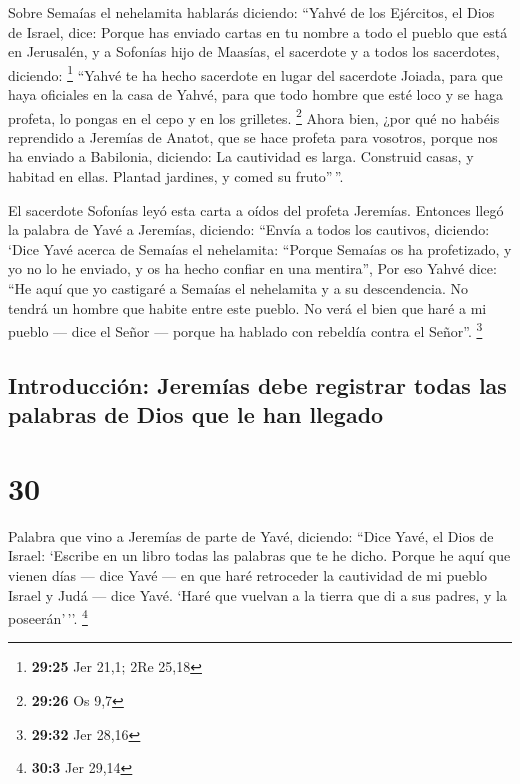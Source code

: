  Sobre Semaías el nehelamita hablarás diciendo:
 ``Yahvé de los Ejércitos, el Dios de Israel, dice:
Porque has enviado cartas en tu nombre a todo el pueblo que está en
Jerusalén, y a Sofonías hijo de Maasías, el sacerdote y a todos los
sacerdotes, diciendo: \footnote{\textbf{29:25} Jer 21,1; 2Re 25,18}
 ``Yahvé te ha hecho sacerdote en lugar del sacerdote
Joiada, para que haya oficiales en la casa de Yahvé, para que todo
hombre que esté loco y se haga profeta, lo pongas en el cepo y en los
grilletes. \footnote{\textbf{29:26} Os 9,7}  Ahora bien,
¿por qué no habéis reprendido a Jeremías de Anatot, que se hace profeta
para vosotros,  porque nos ha enviado a Babilonia,
diciendo: La cautividad es larga. Construid casas, y habitad en ellas.
Plantad jardines, y comed su fruto''\,''.

 El sacerdote Sofonías leyó esta carta a oídos del
profeta Jeremías.  Entonces llegó la palabra de Yavé a
Jeremías, diciendo:  ``Envía a todos los cautivos,
diciendo: `Dice Yavé acerca de Semaías el nehelamita: ``Porque Semaías
os ha profetizado, y yo no lo he enviado, y os ha hecho confiar en una
mentira'',  Por eso Yahvé dice: ``He aquí que yo
castigaré a Semaías el nehelamita y a su descendencia. No tendrá un
hombre que habite entre este pueblo. No verá el bien que haré a mi
pueblo --- dice el Señor --- porque ha hablado con rebeldía contra el
Señor''. \footnote{\textbf{29:32} Jer 28,16}

\hypertarget{introducciuxf3n-jeremuxedas-debe-registrar-todas-las-palabras-de-dios-que-le-han-llegado}{%
\subsection{Introducción: Jeremías debe registrar todas las palabras de
Dios que le han
llegado}\label{introducciuxf3n-jeremuxedas-debe-registrar-todas-las-palabras-de-dios-que-le-han-llegado}}

\hypertarget{section-29}{%
\section{30}\label{section-29}}

 Palabra que vino a Jeremías de parte de Yavé, diciendo:
 ``Dice Yavé, el Dios de Israel: `Escribe en un libro
todas las palabras que te he dicho.  Porque he aquí que
vienen días --- dice Yavé --- en que haré retroceder la cautividad de mi
pueblo Israel y Judá --- dice Yavé. `Haré que vuelvan a la tierra que di
a sus padres, y la poseerán'\,''. \footnote{\textbf{30:3} Jer 29,14}

